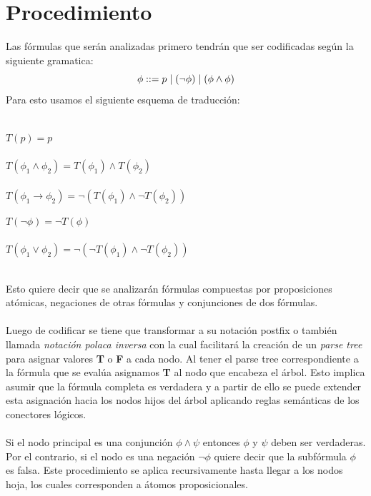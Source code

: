 \documentclass{report}
\begin{document}
	\section{Procedimiento}
	Las f\'ormulas que ser\'an analizadas primero tendr\'an que ser codificadas seg\'un la siguiente gramatica:
	\[ \phi ::= p \hspace{1mm}|\hspace{1mm} (\neg \phi)  \hspace{1mm}|\hspace{1mm} (\phi \land \phi) \]
	Para esto usamos el siguiente esquema de traducci\'on: \\\\
	\begin{minipage}[t]{0.45\textwidth}
		$ T(p)=p $ \\\\
		$ T(\phi_1 \land \phi_2)=T(\phi_1) \land T(\phi_2) $ \\\\
		$ T(\phi_1 \rightarrow \phi_2) = \neg(T(\phi_1) \land \neg T(\phi_2)) $
	\end{minipage}
	\hfill
	\begin{minipage}[t]{0.45\textwidth}
		$ T(\neg \phi) = \neg T(\phi) $ \\\\
		$ T(\phi_1 \lor \phi_2) = \neg(\neg T(\phi_1) \land \neg T(\phi_2)) $
	\end{minipage} \vspace*{5mm} \\ 
	Esto quiere decir que se analizar\'an f\'ormulas compuestas por proposiciones at\'omicas, negaciones de otras f\'ormulas y conjunciones de dos f\'ormulas.\\\\
	Luego de codificar se tiene que transformar a su notaci\'on postfix o tambi\'en llamada \textit{notaci\'on polaca inversa} con la cual facilitar\'a la creaci\'on de un \textit{parse tree} para asignar valores \textbf{T} o \textbf{F} a cada nodo. Al tener el parse tree correspondiente a la f\'ormula que se eval\'ua asignamos \textbf{T} al nodo que encabeza el \'arbol. Esto implica asumir que la f\'ormula completa es verdadera y a partir de ello se puede extender esta asignaci\'on hacia los nodos hijos del \'arbol aplicando reglas sem\'anticas de los conectores l\'ogicos. \\\\
	Si el nodo principal es una conjunci\'on $\phi \land \psi$ entonces $\phi$ y $\psi$ deben ser verdaderas. Por el contrario, si el nodo es una negaci\'on $\neg \phi$ quiere decir que la subf\'ormula $\phi$ es falsa. Este procedimiento se aplica recursivamente hasta llegar a los nodos hoja, los cuales corresponden a \'atomos proposicionales. \\\\
\end{document}
